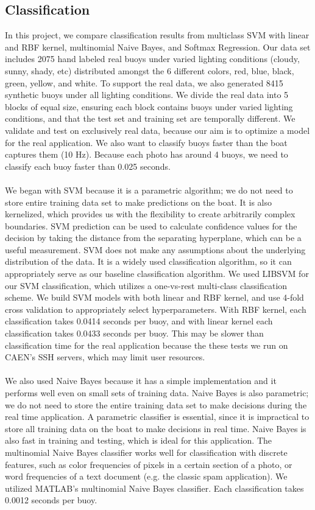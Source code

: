 \documentclass{article} %
\begin{document}
\subsection{Classification}
In this project, we compare classification results from multiclass SVM with linear and RBF kernel, multinomial Naive Bayes, and Softmax Regression. Our data set includes 2075 hand labeled real buoys under varied lighting conditions (cloudy, sunny, shady, etc) distributed amongst the 6 different colors, red, blue, black, green, yellow, and white. To support the real data, we also generated 8415 synthetic buoys under all lighting conditions. We divide the real data into 5 blocks of equal size, ensuring each block contains buoys under varied lighting conditions, and that the test set and training set are temporally different. We validate and test on exclusively real data, because our aim is to optimize a model for the real application. We also want to classify buoys faster than the  boat captures them (10 Hz). Because each photo has around 4 buoys, we need to classify each buoy faster than 0.025 seconds.\\\\
We began with SVM because it is a parametric algorithm; we do not need to store entire training data set to make predictions on the boat. It is also kernelized, which provides us with the flexibility to create arbitrarily complex boundaries. SVM prediction can be used to calculate confidence values for the decision by taking the distance from the separating hyperplane, which can be a useful measurement. SVM does not make any assumptions about the underlying distribution of the data. It is a widely used classification algorithm, so it can appropriately serve as our baseline classification algorithm. We used LIBSVM for our SVM classification, which utilizes a one-vs-rest multi-class classification scheme. We build SVM models with both linear and RBF kernel, and use 4-fold cross validation to appropriately select hyperparameters. With RBF kernel, each classification takes 0.0414 seconds per buoy, and with linear kernel each classification takes 0.0433 seconds per buoy. This may be slower than classification time for the real application because the these tests we run on CAEN's SSH servers, which may limit user resources.\\\\
We also used Naive Bayes because it has a simple implementation and it performs well even on small sets of training data. Naive Bayes is also parametric; we do not need to store the entire training data set to make decisions during the real time application. A parametric classifier is essential, since it is impractical to store all training data on the boat to make decisions in real time. Naive Bayes is also fast in training and testing, which is ideal for this application. The multinomial Naive Bayes classifier works well for classification with discrete features, such as color frequencies of pixels in a certain section of a photo, or word frequencies of a text document (e.g. the classic spam application). We utilized MATLAB's multinomial Naive Bayes classifier. Each classification takes 0.0012 seconds per buoy.\\\\
\end{document}
